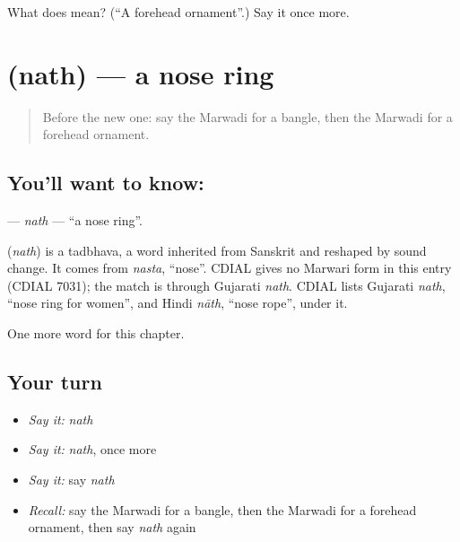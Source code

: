 \begin{tcolorbox}[breakable,colback=teal!4,colframe=teal!35!black,title={Before you move on}]
What does  mean? (\textquotedblleft{}A forehead ornament\textquotedblright{}.) Say it once more.
\end{tcolorbox}
\section[\texorpdfstring{\mw{नथ} (nath)}{नथ (nath)}]{ (nath) — a nose ring}

\label{lesson:MW-C130-nath}



\begin{quote}
Before the new one: say the Marwadi for a bangle, then the Marwadi for a forehead ornament.
\end{quote}

\subsection*{You'll want to know: }
\textbf{} — \emph{nath} — \textquotedblleft{}a nose ring\textquotedblright{}.

\begin{cousinweb}
\textbf{} (\emph{nath}) is a tadbhava, a word inherited from Sanskrit and reshaped by sound change. It comes from \emph{nasta}, \textquotedblleft{}nose\textquotedblright{}. CDIAL gives no Marwari form in this entry (CDIAL 7031); the match is through Gujarati \emph{nath}. CDIAL lists Gujarati \emph{nath}, \textquotedblleft{}nose ring for women\textquotedblright{}, and Hindi \emph{nāth}, \textquotedblleft{}nose rope\textquotedblright{}, under it.
\end{cousinweb}

\begin{grammarlens}[title={What you've built}]
One more word for this chapter.
\end{grammarlens}

\subsection*{Your turn}
\begin{itemize}
\raggedright
  \item \emph{Say it:} \emph{nath}
  \item \emph{Say it:} \emph{nath}, once more
  \item \emph{Say it:} say \emph{nath}
  \item \emph{Recall:} say the Marwadi for a bangle, then the Marwadi for a forehead ornament, then say \emph{nath} again
\end{itemize}

